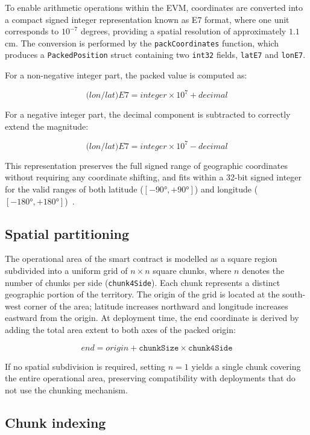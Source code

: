 To enable arithmetic operations within the EVM, coordinates are converted into a compact signed integer representation known as E7 format, where one unit
corresponds to $10^{-7}$ degrees, providing a spatial resolution of approximately $1.1$\,cm.
The conversion is performed by the \texttt{packCoordinates} function, which produces a \texttt{PackedPosition}
struct containing two \texttt{int32} fields, \texttt{latE7} and \texttt{lonE7}.

For a non-negative integer part, the packed value is computed as:

\[
    \textit{(lon/lat)E7} = \textit{integer} \times 10^7 + \textit{decimal}
\]

For a negative integer part, the decimal component is subtracted to correctly
extend the magnitude:

\[
    \textit{(lon/lat)E7} = \textit{integer} \times 10^7 - \textit{decimal}
\]

This representation preserves the full signed range of geographic coordinates without requiring any coordinate shifting,
and fits within a 32-bit signed integer for the valid ranges of both latitude ($[-90\text{°}, +90\text{°}]$) and longitude ($[-180\text{°}, +180\text{°}]$)~\cite{wgs84}.

\subsection{Spatial partitioning}\label{subsec:spatial-partitioning}
The operational area of the smart contract is modelled as a square region subdivided into a uniform grid of $n \times n$ square chunks, where $n$ denotes the number of chunks per side (\texttt{chunk4Side}).
Each chunk represents a distinct geographic portion of the territory.
The origin of the grid is located at the south-west corner of the area; latitude increases northward and longitude increases eastward from the origin.
At deployment time, the end coordinate is derived by adding the total area extent to both axes of the packed origin:

\[
    \textit{end} = \textit{origin} + \texttt{chunkSize} \times \texttt{chunk4Side}
\]

If no spatial subdivision is required, setting $n = 1$ yields a single chunk
covering the entire operational area, preserving compatibility with deployments
that do not use the chunking mechanism.

\subsection{Chunk indexing}\label{subsec:chunk-indexing}

